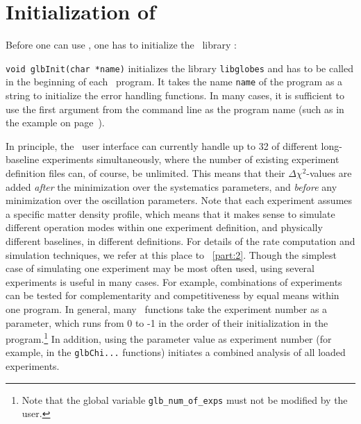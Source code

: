 \section{Initialization of \GLOBES}

Before one can use \GLOBES , one has to initialize the \GLOBES\
library : 
\begin{function}
 {\tt void glbInit(char *name)} initializes the library {\tt libglobes} and has
to be called in the beginning of each \GLOBES\ program. It takes the
name {\tt name} of the program as a string to initialize the error handling
functions. In many cases, it is sufficient to use the first
argument from the command line as the program name (such as in the example on page~\pageref{ex:c}).
\end{function}

In principle, the \GLOBES\ user interface can currently handle up to 32 of different long-baseline experiments simultaneously, where the number
of existing experiment definition files can, of course, be unlimited. This means that their $\Delta \chi^2$-values are added {\em after} the minimization over the systematics parameters, and {\em before} any minimization over the oscillation parameters. Note that each experiment
assumes a specific matter density profile, which means
that it makes sense to simulate different operation modes within one
experiment definition, and physically different baselines, in different
definitions. For details of the rate computation and
simulation techniques, we refer at this place to \Part~\ref{part:2}. Though
 the simplest case of simulating one experiment may be most often used, 
 using several experiments is useful in many cases. For example, combinations of experiments can be tested for
complementarity and competitiveness by equal means within one program.
In general, many \GLOBES\ functions take the experiment number as
a parameter, which runs from $0$ to \GLB{\_num\_of\_exps}-1 in the order of their initialization in the program.\footnote{Note that
the global variable {\tt glb\_num\_of\_exps} must not be modified by the
user.} In addition, using the parameter value \GLBC{GLB\_ALL} as
experiment number (for example, in the {\tt glbChi...} functions) initiates a combined analysis of all loaded experiments.
\index{norm}{GLB ALL@{\tt GLB\_ALL}}

